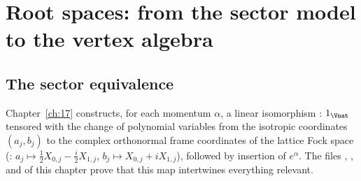 \section{Root spaces: from the sector model to the vertex algebra}\label{ch18:sec:roots}

\subsection{The sector equivalence}

Chapter~\ref{ch:17} constructs, for each momentum $\alpha$, a linear isomorphism
: $1_{\Vnat}$ tensored
with the change of polynomial variables from the isotropic coordinates $(a_j,b_j)$ to the complex orthonormal
frame coordinates of the lattice Fock space (: $a_j\mapsto\frac12X_{0,j}-\frac
i2X_{1,j}$, $b_j\mapsto X_{0,j}+iX_{1,j}$), followed by insertion of $e^\alpha$.  The files
, ,  and
 of this chapter prove that this map intertwines everything relevant.

